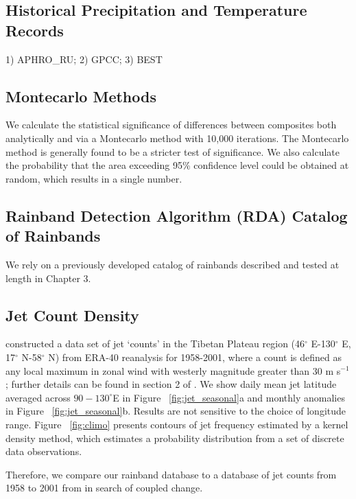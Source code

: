 \subsection{Historical Precipitation and Temperature Records}

1) APHRO_RU; 2) GPCC; 3) BEST
	
\subsection{Montecarlo Methods}	
	
	We calculate the statistical significance of differences between composites both analytically and via a Montecarlo method with 10,000 iterations. The Montecarlo method is generally found to be a stricter test of significance. We also calculate the probability that the area exceeding 95\% confidence level could be obtained at random, which results in a single number.

\subsection{Rainband Detection Algorithm (RDA) Catalog of Rainbands}

	We rely on a previously developed catalog of rainbands described and tested at length in Chapter 3.

\subsection{Jet Count Density} 

	\citet{Schiemann2009} constructed a data set of jet `counts' in the Tibetan Plateau region (46$^{\circ}$ E-130$^{\circ}$ E, 17$^{\circ}$ N-58$^{\circ}$ N) from ERA-40 reanalysis for 1958-2001, where a count is defined as any local maximum in zonal wind with westerly magnitude greater than $30$ m s$^{-1}$; further details can be found in section 2 of \citet{Schiemann2009}. We show daily mean jet latitude averaged across $90-130^\circ$E in Figure ~\ref{fig:jet_seasonal}a and monthly anomalies in Figure ~\ref{fig:jet_seasonal}b. Results are not sensitive to the choice of longitude range. Figure ~\ref{fig:climo} presents contours of jet frequency estimated by a kernel density method, which estimates a probability distribution from a set of discrete data observations.
	
	Therefore, we compare our rainband database to a database of jet counts from 1958 to 2001 from \citet{Schiemann2009} in search of coupled change. 
	
